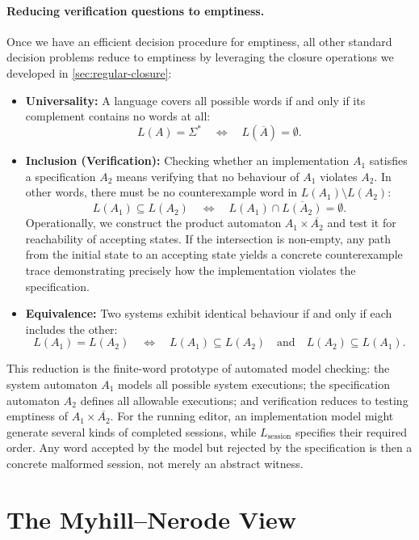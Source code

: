 \paragraph{Reducing verification questions to emptiness.}
Once we have an efficient decision procedure for emptiness, all other standard decision problems reduce to emptiness by leveraging the closure operations we developed in \cref{sec:regular-closure}:
\begin{itemize}
  \item \textbf{Universality:} A language covers all possible words if and only if its complement contains no words at all:
  \[
    L(A)=\Sigma^*
    \quad\Longleftrightarrow\quad
    L(\overline{A})=\emptyset.
  \]
  \item \textbf{Inclusion (Verification):} Checking whether an implementation $A_1$ satisfies a specification $A_2$ means verifying that no behaviour of $A_1$ violates $A_2$. In other words, there must be no counterexample word in $L(A_1)\setminus L(A_2)$:
  \[
    L(A_1)\subseteq L(A_2)
    \quad\Longleftrightarrow\quad
    L(A_1)\cap \overline{L(A_2)}=\emptyset.
  \]
  Operationally, we construct the product automaton $A_1\times\overline{A_2}$ and test it for reachability of accepting states. If the intersection is non-empty, any path from the initial state to an accepting state yields a concrete counterexample trace demonstrating precisely how the implementation violates the specification.
  \item \textbf{Equivalence:} Two systems exhibit identical behaviour if and only if each includes the other:
  \[
    L(A_1)=L(A_2)
    \quad\Longleftrightarrow\quad
    L(A_1)\subseteq L(A_2)\quad\text{and}\quad L(A_2)\subseteq L(A_1).
  \]
\end{itemize}

This reduction is the finite-word prototype of automated model checking: the system automaton $A_1$ models all possible system executions; the specification automaton $A_2$ defines all allowable executions; and verification reduces to testing emptiness of $A_1\times\overline{A_2}$.
For the running editor, an implementation model might generate several
kinds of completed sessions, while \(L_{\mathrm{session}}\) specifies
their required order.  Any word accepted by the model but rejected by
the specification is then a concrete malformed session, not merely an
abstract witness.


\section{The Myhill--Nerode View}
\label{sec:myhill-nerode}

